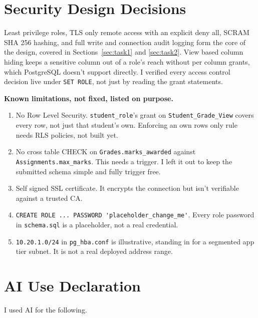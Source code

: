 \documentclass[12pt,a4paper]{article}
\begin{document}
\section{Security Design Decisions}
\label{sec:security}

Least privilege roles, TLS only remote access with an explicit deny all, SCRAM SHA 256 hashing, and full write and connection audit logging form the core of the design, covered in Sections~\ref{sec:task1} and \ref{sec:task2}. View based column hiding keeps a sensitive column out of a role's reach without per column grants, which PostgreSQL doesn't support directly. I verified every access control decision live under \lstinline|SET ROLE|, not just by reading the grant statements.

\noindent\textbf{Known limitations, not fixed, listed on purpose.}

\begin{enumerate}
    \item No Row Level Security. \lstinline|student_role|'s grant on \lstinline|Student_Grade_View| covers every row, not just that student's own. Enforcing an own rows only rule needs RLS policies, not built yet.
    \item No cross table CHECK on \lstinline|Grades.marks_awarded| against \lstinline|Assignments.max_marks|. This needs a trigger. I left it out to keep the submitted schema simple and fully trigger free.
    \item Self signed SSL certificate. It encrypts the connection but isn't verifiable against a trusted CA.
    \item \lstinline|CREATE ROLE ... PASSWORD 'placeholder_change_me'|. Every role password in \lstinline|schema.sql| is a placeholder, not a real credential.
    \item \lstinline|10.20.1.0/24| in \lstinline|pg_hba.conf| is illustrative, standing in for a segmented app tier subnet. It is not a real deployed address range.
\end{enumerate}

\section{AI Use Declaration}
\label{sec:ai}

I used AI for the following.
\end{document}
